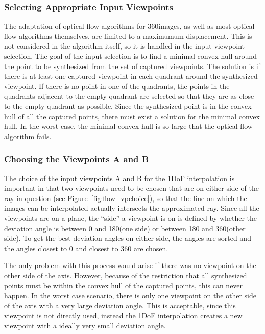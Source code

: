 \subsubsection{Selecting Appropriate Input Viewpoints}
The adaptation of optical flow algorithms for 360\degree images, as well as most optical flow algorithms themselves, are limited to a maximumum displacement. This is not considered in the algorithm itself, so it is handled in the input viewpoint selection. The goal of the input selection is to find a minimal convex hull around the point to be synthesized from the set of captured viewpoints. The solution is if there is at least one captured viewpoint in each quadrant around the synthesized viewpoint. If there is no point in one of the quadrants, the points in the quadrants adjacent to the empty quadrant are selected so that they are as close to the empty quadrant as possible. Since the synthesized point is in the convex hull of all the captured points, there must exist a solution for the minimal convex hull. In the worst case, the minimal convex hull is so large that the optical flow algorithm fails.

\subsubsection{Choosing the Viewpoints A and B}
The choice of the input viewpoints A and B for the 1DoF interpolation is important in that two viewpoints need to be chosen that are on either side of the ray in question (see Figure~\ref{fig:flow_vpchoice}), so that the line on which the images can be interpolated actually intersects the approximated ray. Since all the viewpoints are on a plane, the ``side'' a viewpoint is on is defined by whether the deviation angle is between 0 and 180\degree (one side) or between 180 and 360\degree (other side). 
To get the best deviation angles on either side, the angles are sorted and the angles closest to 0 and closest to 360 are chosen.

The only problem with this process would arise if there was no viewpoint on the other side of the axis. However, because of the restriction that all synthesized points must be within the convex hull of the captured points, this can never happen. In the worst case scenario, there is only one viewpoint on the other side of the axis with a very large deviation angle. This is acceptable, since this viewpoint is not directly used, instead the 1DoF interpolation creates a new viewpoint with a ideally very small deviation angle.

